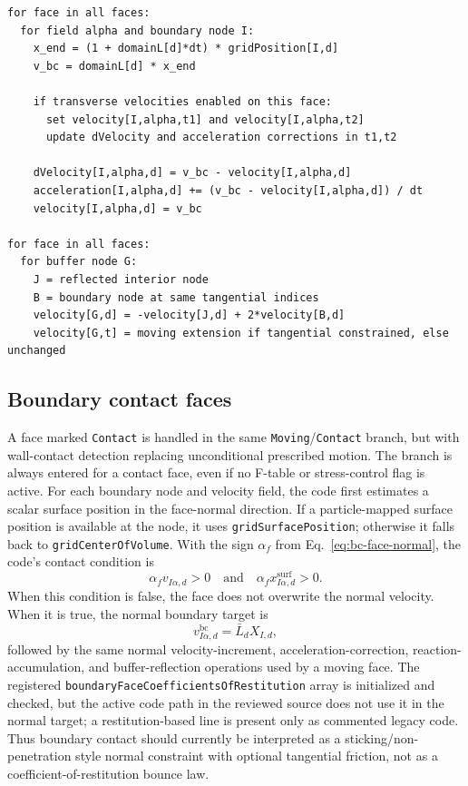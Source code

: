 \begin{lstlisting}[caption={Moving-face enforcement.}]
for face in all faces:
  for field alpha and boundary node I:
    x_end = (1 + domainL[d]*dt) * gridPosition[I,d]
    v_bc = domainL[d] * x_end

    if transverse velocities enabled on this face:
      set velocity[I,alpha,t1] and velocity[I,alpha,t2]
      update dVelocity and acceleration corrections in t1,t2

    dVelocity[I,alpha,d] = v_bc - velocity[I,alpha,d]
    acceleration[I,alpha,d] += (v_bc - velocity[I,alpha,d]) / dt
    velocity[I,alpha,d] = v_bc

for face in all faces:
  for buffer node G:
    J = reflected interior node
    B = boundary node at same tangential indices
    velocity[G,d] = -velocity[J,d] + 2*velocity[B,d]
    velocity[G,t] = moving extension if tangential constrained, else unchanged
\end{lstlisting}



\subsection{Boundary contact faces}
\label{subsec:bc-contact-wall}

A face marked \texttt{Contact} is handled in the same \texttt{Moving}/\texttt{Contact} branch, but with wall-contact detection replacing unconditional prescribed motion.  The branch is always entered for a contact face, even if no F-table or stress-control flag is active.  For each boundary node and velocity field, the code first estimates a scalar surface position in the face-normal direction.  If a particle-mapped surface position is available at the node, it uses \texttt{gridSurfacePosition}; otherwise it falls back to \texttt{gridCenterOfVolume}.  With the sign $\alpha_f$ from Eq.~\eqref{eq:bc-face-normal}, the code's contact condition is
\begin{equation}
  \alpha_f v_{I\alpha,d} > 0
  \quad\text{and}\quad
  \alpha_f x^{\mathrm{surf}}_{I\alpha,d} > 0.
  \label{eq:bc-wall-contact-condition}
\end{equation}
When this condition is false, the face does not overwrite the normal velocity.  When it is true, the normal boundary target is
\begin{equation}
  v_{I\alpha,d}^{\mathrm{bc}} = \bar L_d X_{I,d},
  \label{eq:bc-wall-normal-target}
\end{equation}
followed by the same normal velocity-increment, acceleration-correction, reaction-accumulation, and buffer-reflection operations used by a moving face.  The registered \texttt{boundaryFaceCoefficientsOfRestitution} array is initialized and checked, but the active code path in the reviewed source does not use it in the normal target; a restitution-based line is present only as commented legacy code.  Thus boundary contact should currently be interpreted as a sticking/non-penetration style normal constraint with optional tangential friction, not as a coefficient-of-restitution bounce law.

